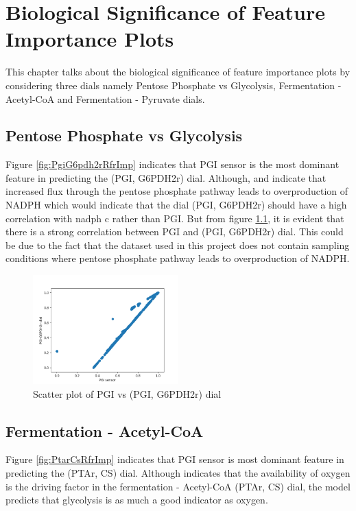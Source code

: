 \documentclass[12pt,chapterheads]{ucsd}
\begin{document}

\chapter{Biological Significance of Feature Importance Plots}\label{chap:bioSig}
 This chapter talks about the biological significance of feature importance plots by considering three dials namely Pentose Phosphate vs Glycolysis, Fermentation - Acetyl-CoA and Fermentation - Pyruvate dials.
\section{Pentose Phosphate vs Glycolysis}
Figure \ref{fig:PgiG6pdh2rRfrImp} indicates that PGI sensor is the most dominant feature in predicting the (PGI, G6PDH2r) dial. Although, \cite{pmid16899} and \cite{Fraenkel1967} indicate that increased flux through the pentose phosphate pathway leads to overproduction of NADPH which would indicate that the dial (PGI, G6PDH2r) should have a high correlation with nadph \textunderscore c rather than PGI. But from figure \ref{fig:PGIvsPGIG6PDH2rDial}, it is evident that there is a strong correlation between PGI and (PGI, G6PDH2r) dial. This could be due to the fact that the dataset used in this project does not contain sampling conditions where pentose phosphate pathway leads to overproduction of NADPH.
\begin{figure}[h] 
\centering
\includegraphics[width=0.5\textwidth]{PGI_PGI_G6PDH2r_new.png}
\caption[Scatter plot of PGI vs (PGI, G6PDH2r) dial]
{Scatter plot of PGI vs (PGI, G6PDH2r) dial}
\label{fig:PGIvsPGIG6PDH2rDial}
\end{figure}

\section{Fermentation - Acetyl-CoA}
Figure \ref{fig:PtarCsRfrImp} indicates that PGI sensor is most dominant feature in predicting the (PTAr, CS) dial. Although \cite{pmid9484901} indicates that the availability of oxygen is the driving factor in the fermentation - Acetyl-CoA (PTAr, CS) dial, the model predicts that glycolysis is as much a good indicator as oxygen. 
\end{document}
